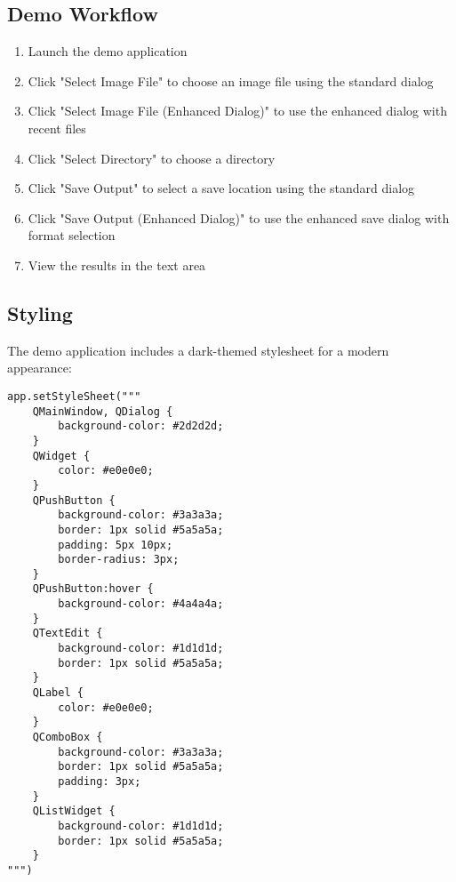 \subsection{Demo Workflow}

\begin{enumerate}
    \item Launch the demo application
    \item Click "Select Image File" to choose an image file using the standard dialog
    \item Click "Select Image File (Enhanced Dialog)" to use the enhanced dialog with recent files
    \item Click "Select Directory" to choose a directory
    \item Click "Save Output" to select a save location using the standard dialog
    \item Click "Save Output (Enhanced Dialog)" to use the enhanced save dialog with format selection
    \item View the results in the text area
\end{enumerate}

\subsection{Styling}

The demo application includes a dark-themed stylesheet for a modern appearance:

\begin{verbatim}
app.setStyleSheet("""
    QMainWindow, QDialog {
        background-color: #2d2d2d;
    }
    QWidget {
        color: #e0e0e0;
    }
    QPushButton {
        background-color: #3a3a3a;
        border: 1px solid #5a5a5a;
        padding: 5px 10px;
        border-radius: 3px;
    }
    QPushButton:hover {
        background-color: #4a4a4a;
    }
    QTextEdit {
        background-color: #1d1d1d;
        border: 1px solid #5a5a5a;
    }
    QLabel {
        color: #e0e0e0;
    }
    QComboBox {
        background-color: #3a3a3a;
        border: 1px solid #5a5a5a;
        padding: 3px;
    }
    QListWidget {
        background-color: #1d1d1d;
        border: 1px solid #5a5a5a;
    }
""")
\end{verbatim} 